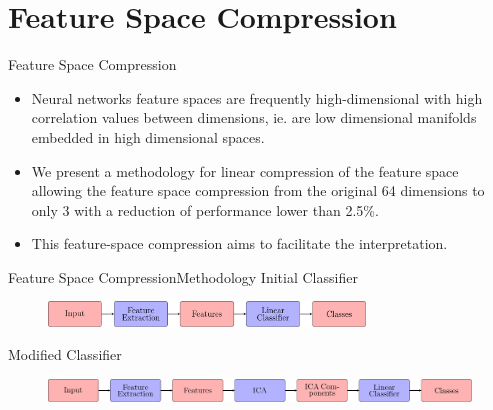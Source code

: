 \documentclass{beamer}
\begin{document}
\section{Feature Space Compression}

\begin{frame}{Feature Space Compression}{}
\begin{itemize}
\item Neural networks feature spaces are frequently high-dimensional with high correlation values between  dimensions, ie. are low dimensional manifolds embedded in high dimensional spaces.
\item We present a methodology for linear compression of the feature space allowing the feature space compression from the original 64 dimensions to only 3 with a reduction of performance lower than 2.5\%.
\item This feature-space compression aims to facilitate the interpretation.
\end{itemize}
\end{frame}

\begin{frame}{Feature Space Compression}{Methodology}
\alert{Initial Classifier}
\begin{figure}
	\centering
	\includegraphics[width=0.75\textwidth]{chapter_ica/initial_classifier.pdf}
\end{figure}
\alert{Modified Classifier}
\begin{figure}
	\centering
	\includegraphics[width=\textwidth]{chapter_ica/ica_classifier.pdf}
\end{figure}

\end{frame}
\end{document}
